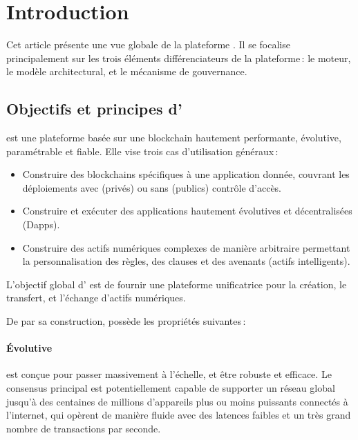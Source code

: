 \documentclass[runningheads,francais,a4paper]{llncs}
\begin{document}
\section{Introduction}
\label{section:introduction}
\setlength{\parindent}{0pt} Cet article présente une vue globale de la plateforme \AVAPlatformName{}. Il se focalise principalement sur les trois éléments
différenciateurs de la plateforme\,: le moteur, le modèle architectural, et le mécanisme de gouvernance.

\subsection{Objectifs et principes d'\AVAPlatformName{}}
\AVAPlatformName{} est une plateforme basée sur une blockchain hautement performante, évolutive, paramétrable et fiable.
Elle vise trois cas d'utilisation généraux\,:
\begin{itemize}
\item Construire des blockchains spécifiques à une application donnée, couvrant les déploiements avec (privés) ou sans
  (publics) contrôle d'accès.
\item Construire et exécuter des applications hautement évolutives et décentralisées (Dapps).
\item Construire des actifs numériques complexes de manière arbitraire permettant la personnalisation des règles,
  des clauses et des avenants (actifs intelligents).
\end{itemize}
L'objectif global d'\AVAPlatformName{} est de fournir une plateforme unificatrice pour la création, le transfert, et
l'échange d'actifs numériques.

\noindent De par sa construction, \AVAPlatformName{} possède les propriétés suivantes\,:

\paragraph{Évolutive} \AVAPlatformName{} est conçue pour passer massivement à l'échelle, et être robuste et efficace.
Le consensus principal est potentiellement capable de supporter un réseau global jusqu'à des centaines de millions
d'appareils plus ou moins puissants connectés à l'internet, qui opèrent de manière fluide avec des latences faibles et un
très grand nombre de transactions par seconde.
\end{document}
